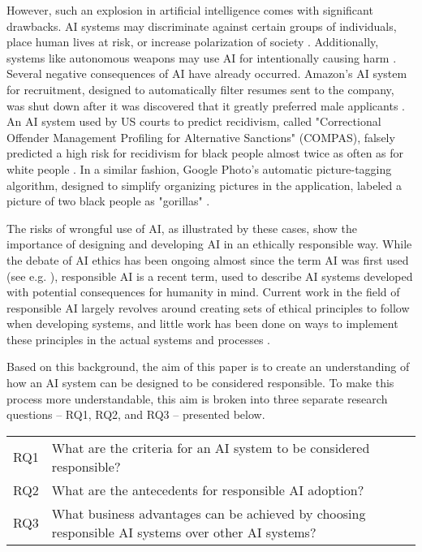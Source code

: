 However, such an explosion in artificial intelligence comes with significant drawbacks. AI systems may discriminate against certain groups of individuals, place human lives at risk, or increase polarization of society \parencite{Mikalef_2022}. Additionally, systems like autonomous weapons may use AI for intentionally causing harm \parencite{Eitel-Porter_2021}. Several negative consequences of AI have already occurred. Amazon's AI system for recruitment, designed to automatically filter resumes sent to the company, was shut down after it was discovered that it greatly preferred male applicants \parencite{Amazon_case_intro}. An AI system used by US courts to predict recidivism, called "Correctional Offender Management Profiling for Alternative Sanctions" (COMPAS), falsely predicted a high risk for recidivism for black people almost twice as often as for white people \parencite{COMPAS_2016_intro}.  In a similar fashion, Google Photo's automatic picture-tagging algorithm, designed to simplify organizing pictures in the application, labeled a picture of two black people as "gorillas" \parencite{Google_case_intro}.

The risks of wrongful use of AI, as illustrated by these cases, show the importance of designing and developing AI in an ethically responsible way. While the debate of AI ethics has been ongoing almost since the term AI was first used (see e.g. \cite{Wiener_1960,Samuel_1960}), responsible AI is a recent term, used to describe AI systems developed with potential consequences for humanity in mind. Current work in the field of responsible AI largely revolves around creating sets of ethical principles to follow when developing systems, and little work has been done on ways to implement these principles in the actual systems and processes \parencite{BarredoArrieta_2020}.

Based on this background, the aim of this paper is to create an understanding of how an AI system can be designed to be considered responsible. To make this process more understandable, this aim is broken into three separate research questions -- RQ1, RQ2, and RQ3 -- presented below.

\begin{table}[h]
    \centering
    \begin{tabular}{cp{}}
        RQ1 & What are the criteria for an AI system to be considered responsible? \\
        RQ2 & What are the antecedents for responsible AI adoption? \\
        RQ3 & What business advantages can be achieved by choosing responsible AI systems over other AI systems? \\
    \end{tabular}
\end{table}


